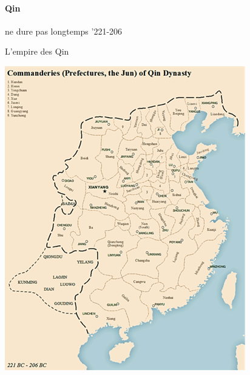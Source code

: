 \paragraph{Qin} ne dure pas longtemps '221-206

\begin{marginfigure}
    \centering
        \caption{L'empire des Qin}
\includegraphics[width= \textwidth]{ConfucianismeTaoismeBouddhismeChinois/Images/CarteQin.png}

    \label{fig:enter-label}
\end{marginfigure}

